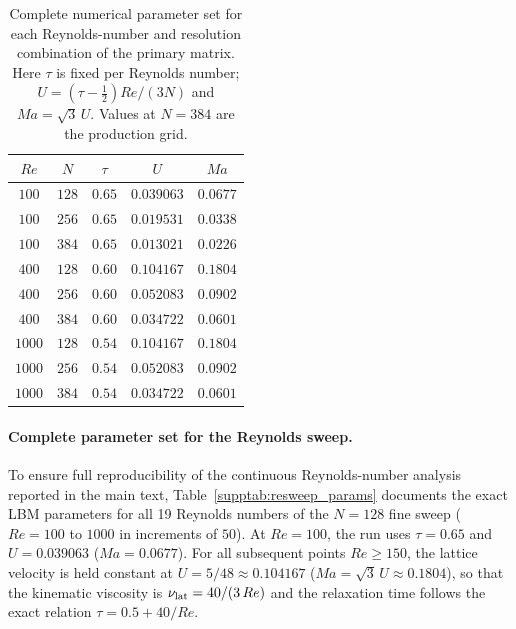 \begin{table}[!htbp]
\centering
\caption{Complete numerical parameter set for each Reynolds-number and resolution combination of the primary matrix. Here $\tau$ is fixed per Reynolds number; $U=(\tau-\tfrac12)Re/(3N)$ and $Ma=\sqrt{3}\,U$. Values at $N=384$ are the production grid.}
\label{supptab:params}
\begin{tabular}{@{}ccccc@{}}
\hline
$Re$ & $N$ & $\tau$ & $U$ & $Ma$ \\
\hline
$100$  & $128$ & $0.65$ & $0.039063$ & $0.0677$ \\
$100$  & $256$ & $0.65$ & $0.019531$ & $0.0338$ \\
$100$  & $384$ & $0.65$ & $0.013021$ & $0.0226$ \\
$400$  & $128$ & $0.60$ & $0.104167$ & $0.1804$ \\
$400$  & $256$ & $0.60$ & $0.052083$ & $0.0902$ \\
$400$  & $384$ & $0.60$ & $0.034722$ & $0.0601$ \\
$1000$ & $128$ & $0.54$ & $0.104167$ & $0.1804$ \\
$1000$ & $256$ & $0.54$ & $0.052083$ & $0.0902$ \\
$1000$ & $384$ & $0.54$ & $0.034722$ & $0.0601$ \\
\hline
\end{tabular}
\end{table}

\paragraph{Complete parameter set for the Reynolds sweep.}
To ensure full reproducibility of the continuous Reynolds-number analysis reported in the main text, Table~\ref{supptab:resweep_params} documents the exact LBM parameters for all 19 Reynolds numbers of the $N=128$ fine sweep ($Re=100$ to $1000$ in increments of $50$). At $Re=100$, the run uses $\tau=0.65$ and $U=0.039063$ ($Ma=0.0677$). For all subsequent points $Re\ge150$, the lattice velocity is held constant at $U=5/48\approx0.104167$ ($Ma=\sqrt{3}\,U\approx0.1804$), so that the kinematic viscosity is $\nu_{\rm lat} = 40/(3\,Re)$ and the relaxation time follows the exact relation $\tau = 0.5 + 40/Re$.

